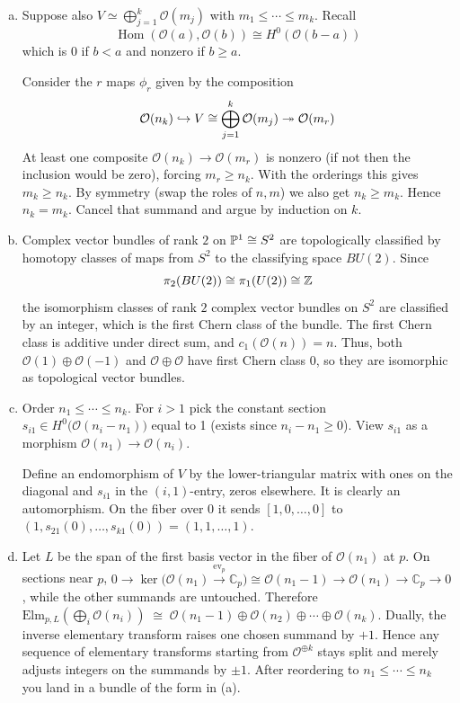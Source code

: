 \documentclass[12pt]{article}
\begin{document}
\begin{solution}
    \leavevmode
    \begin{enumerate}[(a)]
        \item Suppose also $V\simeq \bigoplus_{j=1}^k \mathcal O(m_j)$ with $m_1\le\cdots\le m_k$. Recall \[\operatorname{Hom}(\mathcal O(a),\mathcal O(b)) \cong H^0(\mathcal O(b-a))\] which is $0$ if $b<a$ and nonzero if $b\ge a$.

        Consider the $r$ maps $\phi_r$ given by the composition
        \begin{align*}
            \cO(n_k) \hookrightarrow V \cong \bigoplus_{j=1}^k \cO(m_j) \twoheadrightarrow \cO(m_r)
        \end{align*}
        At least one composite
        $\mathcal O(n_k)\to \mathcal O(m_r)$ is nonzero (if not then the inclusion would be zero), forcing $m_r\ge n_k$. With the orderings this gives $m_k\ge n_k$. By symmetry (swap the roles of $n,m$) we also get $n_k\ge m_k$. Hence $n_k=m_k$. Cancel that summand and argue by induction on $k$. 
        \item Complex vector bundles of rank $2$ on $\P^1\cong S^2$ are topologically classified by homotopy classes of maps from $S^2$ to the classifying space $BU(2)$. Since \[\pi_2(BU(2))\cong \pi_1(U(2))\cong \Z\] the isomorphism classes of rank $2$ complex vector bundles on $S^2$ are classified by an integer, which is the first Chern class of the bundle. The first Chern class is additive under direct sum, and $c_1(\mathcal O(n)) = n$. Thus, both $\mathcal O(1)\oplus \mathcal O(-1)$ and $\mathcal O\oplus \mathcal O$ have first Chern class $0$, so they are isomorphic as topological vector bundles.
        \item Order $n_1\le\cdots\le n_k$. For $i>1$ pick the constant section $s_{i1}\in H^0\!\big(\mathcal O(n_i-n_1)\big)$ equal to 1 (exists since $n_i-n_1\ge 0$). View $s_{i1}$ as a morphism $\mathcal O(n_1)\to \mathcal O(n_i)$.

        Define an endomorphism of $V$ by the lower-triangular matrix with ones on the diagonal and $s_{i1}$ in the $(i,1)$-entry, zeros elsewhere. It is clearly an automorphism. On the fiber over 0 it sends $[1,0,\dots,0]$ to $(1,s_{21}(0),\dots,s_{k1}(0))=(1,1,\dots,1)$.
        \item Let $L$ be the span of the first basis vector in the fiber of $\mathcal O(n_1)$ at $p$. On sections near $p$,
        $0\to \ker\big(\mathcal O(n_1)\xrightarrow{\mathrm{ev}_p}\mathbb C_p\big)\cong \mathcal O(n_1-1)\to \mathcal O(n_1)\to \mathbb C_p\to 0$,
        while the other summands are untouched. Therefore
        $\mathrm{Elm}_{p,L}\!\left(\bigoplus_i \mathcal O(n_i)\right)\;\cong\; \mathcal O(n_1-1)\oplus \mathcal O(n_2)\oplus\cdots\oplus \mathcal O(n_k)$. Dually, the inverse elementary transform raises one chosen summand by $+1$.
        Hence any sequence of elementary transforms starting from $\mathcal O^{\oplus k}$ stays split and merely adjusts integers on the summands by $\pm1$. After reordering to $n_1\le\cdots\le n_k$ you land in a bundle of the form in (a).
    \end{enumerate}
\end{solution}
\end{document}
